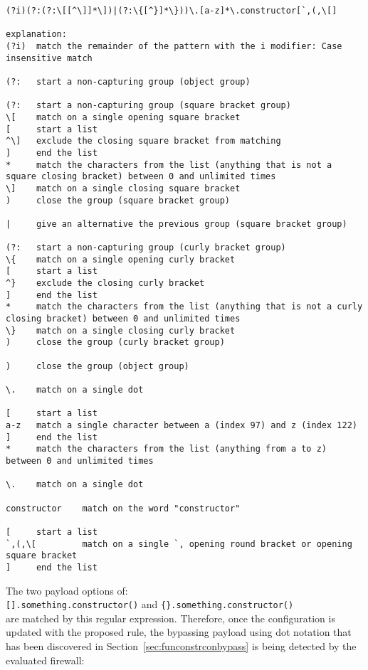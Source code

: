 \begin{lstlisting}[style=basicStyle, caption=regex of proposed rule id:2, label={lst:constructorsruleproposalregexA}]
(?i)(?:(?:\[[^\]]*\])|(?:\{[^}]*\}))\.[a-z]*\.constructor[`,(,\[]

explanation:
(?i)  match the remainder of the pattern with the i modifier: Case insensitive match

(?:   start a non-capturing group (object group)

(?:   start a non-capturing group (square bracket group)
\[    match on a single opening square bracket
[     start a list
^\]   exclude the closing square bracket from matching
]     end the list
*     match the characters from the list (anything that is not a square closing bracket) between 0 and unlimited times
\]    match on a single closing square bracket
)     close the group (square bracket group)

|     give an alternative the previous group (square bracket group)

(?:	  start a non-capturing group (curly bracket group)
\{	  match on a single opening curly bracket
[     start a list
^}	  exclude the closing curly bracket
]     end the list
*     match the characters from the list (anything that is not a curly closing bracket) between 0 and unlimited times
\}	  match on a single closing curly bracket
)     close the group (curly bracket group)

)     close the group (object group)

\.    match on a single dot

[     start a list
a-z   match a single character between a (index 97) and z (index 122)
]     end the list
*     match the characters from the list (anything from a to z) between 0 and unlimited times

\.	  match on a single dot

constructor    match on the word "constructor"

[     start a list
`,(,\[         match on a single `, opening round bracket or opening square bracket
]     end the list
\end{lstlisting}

The two payload options of: \\
\verb|[].something.constructor()| and \verb|{}.something.constructor()| \\
are matched by this regular expression. Therefore, once the configuration is updated with the proposed rule, the bypassing payload using dot notation that has been discovered in Section~\ref{sec:funconstrconbypass} is being detected by the evaluated firewall:

